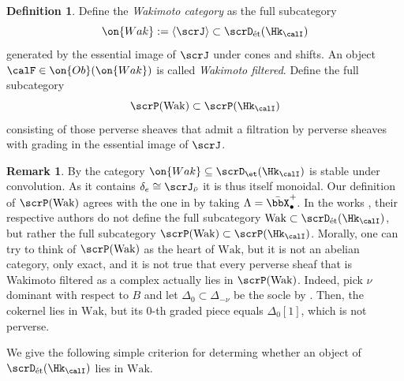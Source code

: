 \documentclass[10pt, reqno]{amsart}
\theoremstyle{plain}
\theoremstyle{definition}
\newtheorem{definition}[theorem]{Definition}
\newtheorem{remark}[theorem]{Remark}
\numberwithin{equation}{section}
\begin{document}
	\begin{definition}
		Define the \textit{Wakimoto category} as the full subcategory 
		$$
		\on{Wak}:=\langle \scrJ \rangle \subset\scrD_{\mathrm{\acute{e}t}}(\Hk_\calI)
		$$ 
		generated by the essential image of $\scrJ$ under cones and shifts. An object $\calF \in \on{Ob}(\on{Wak})$ is called \textit{Wakimoto filtered}. Define the full subcategory 
		\[
		\scrP(\mathrm{Wak}) \subset \scrP(\Hk_\calI)
		\]
		consisting of those perverse sheaves that admit a filtration by perverse sheaves with grading in the essential image of $\scrJ$.
	\end{definition}
	
	
	
	\begin{remark}
		By   the category $\on{Wak}\subseteq \scrD_\et(\Hk_{\calI})$ is stable under convolution. As it contains $\delta_e\cong \scrJ_{\bar\nu}$ it is thus itself monoidal. Our definition of $\scrP(\mathrm{Wak})$ agrees with the one in \cite[\S4.3.2]{AR} by taking $\Lambda=\bar{\bbX}_\bullet^+$. In the works \cite{AB09,AR}, their respective authors do not define the full subcategory 
		$\mathrm{Wak}\subset \scrD_{\mathrm{\acute{e}t}}(\Hk_\calI)$, but rather the full subcategory 
		$
		\scrP(\mathrm{Wak}) \subset \scrP(\Hk_\calI)
		$.
		Morally, one can try to think of $\scrP(\mathrm{Wak})$ as the heart of $\mathrm{Wak}$, but it is not an abelian category, only exact, and it is not true that every perverse sheaf that is Wakimoto filtered as a complex actually lies in $\scrP(\mathrm{Wak})$. Indeed, pick $\nu$ dominant with respect to $B$ and let $\Delta_0 \subset \Delta_{-\nu}$ be the socle by \cite[Lemma 2.1]{BBM04}. Then, the cokernel lies in $\mathrm{Wak}$, but its $0$-th graded piece equals $\Delta_0[1]$, which is not perverse.
	\end{remark}
	
	We give the following simple criterion for determing whether an object of $\scrD_{\mathrm{\acute{e}t}}(\Hk_\calI)$ lies in $\mathrm{Wak}$.
	
\end{document}
